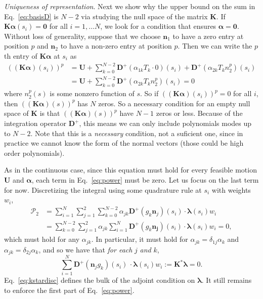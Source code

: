 \textit{Uniqueness of representation}. Next we show why the upper bound on the sum in Eq.\ \eqref{eq:basisD} is $N-2$ via studying the null space of the matrix $\bm{K}$. If $\bm{K}\bm{\alpha}(s_i)=\bm{0}$ for all $i = 1, \dots N$, we look for a condition that ensures $\bm{\alpha}=\bm{0}$. Without loss of generality, suppose that we choose $\bm{n}_1$ to have a zero entry at position $p$ and $\bm{n}_2$ to have a non-zero entry at position $p$. Then we can write the $p$th entry of $\bm{K}\bm{\alpha}$ at $s_i$ as 
\begin{align}
\left(\left(\bm{K}\bm{\alpha}\right)(s_i)\right)^p & = \bm{U} + \sum_{k=0}^{N-2} \bm{D}^+ \left(\alpha_{1k} T_k \cdot 0\right)(s_i) +  \bm{D}^+ \left(\alpha_{2k} T_k n_2^p\right)(s_i)\\[4 pt] & =\bm{U} + \sum_{k=0}^{N-2} \bm{D}^+ \left(\alpha_{2k} T_k n_2^p\right)(s_i) =0
\end{align}
where $n_2^p(s)$ is some nonzero function of $s$. So if $\left(\left(\bm{K}\bm{\alpha}\right)(s_i)\right)^p=0$ for all $i$, then $\left(\left(\bm{K}\bm{\alpha}\right)(s)\right)^p$ has $N$ zeros.  So a necessary condition for an empty null space of $\bm{K}$ is that $\left(\left(\bm{K}\bm{\alpha}\right)(s)\right)^p$ have $N-1$ zeros or less. Because of the integration operator $\bm{D}^+$, this means we can only include polynomials modes up to $N-2$. Note that this is a \textit{necessary} condition, not a suficient one, since in practice we cannot know the form of the normal vectors (those could be high order polynomials). 

\iffalse
As in the continuous case, since this equation must hold for every feasible motion $\bm{U}$ and $\bm{\alpha}$, each term in Eq.\ \eqref{eq:power} must be zero. Let us focus on the last term for now. Discretizing the integral using some quadrature rule at $s_i$ with weights $w_i$,
\begin{align}
    \mathcal{P}_2 &= \sum_{i=1}^{N} \sum_{j=1}^2\sum_{k=0}^{N-2} \alpha_{jk}\bm{D}^+\left(g_k \bm{n}_j\right)(s_i) \cdot \bm{\lambda}(s_i) w_i \\[4 pt]
& = \sum_{k=0}^{N-2} \sum_{j=1}^2 \alpha_{jk} \sum_{i=1}^{N} \bm{D}^+\left(g_k \bm{n_j}\right)(s_i) \cdot \bm{\lambda}(s_i) w_i=0, 
\end{align}
which must hold for any $\alpha_{jk}$. In particular, it must hold for $\alpha_{jk}=\delta_{1j} \alpha_k$ and $\alpha_{jk}=\delta_{2j} \alpha_k$, and so we have that \textit{for each} $j$ \textit{and} $k$, 
\begin{equation}
\label{eq:kstardisc}
    \sum_{i=1}^{N}\bm{D}^+\left(\bm{n}_j g_k\right)(s_i) \, \cdot \bm{\lambda}(s_i) w_i:=\bm{K}^*\bm{\lambda}=0.
\end{equation}
Eq.\ \eqref{eq:kstardisc} defines the bulk of the adjoint condition on $\bm{\lambda}$. It still remains to enforce the first part of Eq.\ \eqref{eq:power}. 

